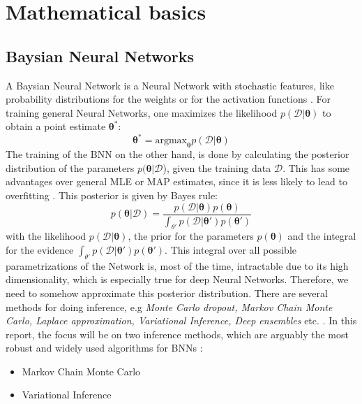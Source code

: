 \documentclass{article}
\newcommand{\argmax}{\text{argmax}}
\begin{document}
\section{Mathematical basics}
\subsection{Baysian Neural Networks}
A Baysian Neural Network is a Neural Network with stochastic features, like probability distributions for the weights or for the activation functions \cite{BNNTut}. For training general Neural Networks, one maximizes the likelihood $p(\mathcal{D}|\bm \theta)$ to obtain a point estimate $\bm \theta^*$:
\begin{equation}
    \bm \theta^* = \argmax_{\bm{\theta}} p(\mathcal{D}|\bm \theta)
\end{equation}
The training of the BNN on the other hand, is done by calculating the posterior distribution of the parameters $p(\bm \theta | \mathcal{D}$), given the training data $\mathcal D$. This has some advantages over general MLE or MAP estimates, since it is less likely to lead to overfitting \cite{BNNdistill}. This posterior is given by Bayes rule:
\begin{equation} \label{eq:post_params}
    p(\bm \theta|\mathcal{D}) = \frac{p(\mathcal{D}|\bm \theta)p(\bm \theta)}{\int_{\theta'}p(\mathcal{D}|\bm \theta')p(\bm \theta')}
\end{equation}
with the likelihood $p(\mathcal{D}|\bm \theta)$, the prior for the parameters $p(\bm \theta)$ and the integral for the evidence $\int_{\theta'}p(\mathcal{D}|\bm \theta')p(\bm \theta')$. This integral over all possible parametrizations of the Network is, most of the time, intractable due to its high dimensionality, which is especially true for deep Neural Networks. Therefore, we need to somehow approximate this posterior distribution. There are several methods for doing inference, e.g \textit{Monte Carlo dropout, Markov Chain Monte Carlo, Laplace approximation, Variational Inference, Deep ensembles} etc. \cite{murphy}. In this report, the focus will be on two inference methods, which are arguably the most robust and widely used algorithms for BNNs \cite{BNNTut}:
\begin{itemize}
    \item Markov Chain Monte Carlo
    \item Variational Inference
\end{itemize}
\end{document}
